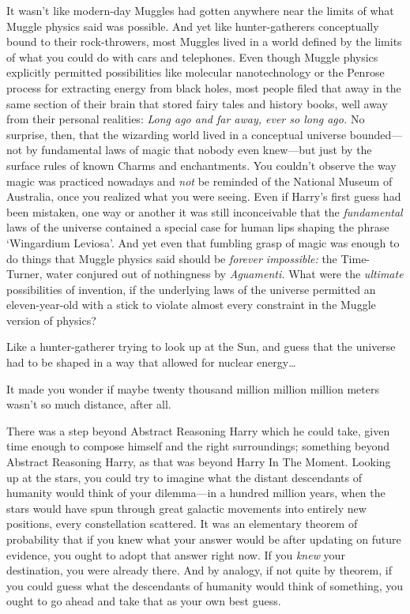 It wasn't like modern-day Muggles had gotten anywhere near the limits of what 
Muggle physics said was possible. And yet like hunter-gatherers conceptually 
bound to their rock-throwers, most Muggles lived in a world defined by the 
limits of what you could do with cars and telephones. Even though Muggle 
physics explicitly permitted possibilities like molecular nanotechnology or the 
Penrose process for extracting energy from black holes, most people filed that 
away in the same section of their brain that stored fairy tales and history 
books, well away from their personal realities: \emph{Long ago and far away, 
ever so long ago.} No surprise, then, that the wizarding world lived in a 
conceptual universe bounded---not by fundamental laws of magic that nobody even 
knew---but just by the surface rules of known Charms and enchantments. You 
couldn't observe the way magic was practiced nowadays and \emph{not} be 
reminded of the National Museum of Australia, once you realized what you were 
seeing. Even if Harry's first guess had been mistaken, one way or another it 
was still inconceivable that the \emph{fundamental} laws of the universe 
contained a special case for human lips shaping the phrase `Wingardium 
Leviosa'. And yet even that fumbling grasp of magic was enough to do things 
that Muggle physics said should be \emph{forever impossible:} the Time-Turner, 
water conjured out of nothingness by \emph{Aguamenti.} What were the 
\emph{ultimate} possibilities of invention, if the underlying laws of the 
universe permitted an eleven-year-old with a stick to violate almost every 
constraint in the Muggle version of physics?

Like a hunter-gatherer trying to look up at the Sun, and guess that the 
universe had to be shaped in a way that allowed for nuclear energy{\ldots}

It made you wonder if maybe twenty thousand million million million meters 
wasn't so much distance, after all.

There was a step beyond Abstract Reasoning Harry which he could take, given 
time enough to compose himself and the right surroundings; something beyond 
Abstract Reasoning Harry, as that was beyond Harry In The Moment. Looking up at 
the stars, you could try to imagine what the distant descendants of humanity 
would think of your dilemma---in a hundred million years, when the stars would 
have spun through great galactic movements into entirely new positions, every 
constellation scattered. It was an elementary theorem of probability that if 
you knew what your answer would be after updating on future evidence, you ought 
to adopt that answer right now. If you \emph{knew} your destination, you were 
already there. And by analogy, if not quite by theorem, if you could guess what 
the descendants of humanity would think of something, you ought to go ahead and 
take that as your own best guess.


